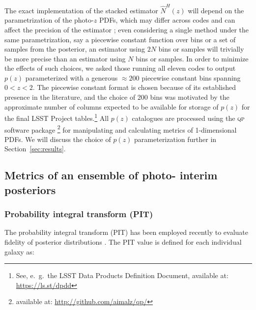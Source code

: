 The exact implementation of the stacked estimator $\hat{N}^{H}(z)$ will depend on the parametrization of the photo-$z$ PDFs, which may differ across codes and can affect the precision of the estimator \citep{Malz:qp}; even considering a single method under the same parametrization, say a piecewise constant function over bins or a set of samples from the posterior, an estimator using $2N$ bins or samples will trivially be more precise than an estimator using $N$ bins or samples.
In order to minimize the effects of such choices, we asked those running all eleven codes to output $p(z)$ parameterized with a generous $\approx 200$ piecewise constant bins spanning $0<z<2$.
The piecewise constant format is chosen because of its established presence in the literature, and the choice of 200 bins was motivated by the approximate number of columns expected to be available for storage of $p(z)$ for the final LSST Project tables.\footnote{See, e.~g.~the LSST Data Products Definition Document, available at: \url{https://ls.st/dpdd}}
All $p(z)$ catalogues are processed using the \textsc{qp} software package \citep{Malz:qp}\footnote{available at: \url{http://github.com/aimalz/qp/}} for manipulating and calculating metrics of 1-dimensional PDFs.
We will discuss the choice of $p(z)$ parameterization further in Section~\ref{sec:results}.


\subsection{Metrics of an ensemble of photo- interim posteriors}
\label{sec:qualmet}

\subsubsection{Probability integral transform (PIT)}
\label{sec:pit}

The probability integral transform (PIT) has been employed recently to evaluate fidelity of posterior distributions  \citep[e.~g.~][]{Bordoloi:10,Polsterer:16,Tanaka:17}.  The PIT value is defined for each individual galaxy as:%

